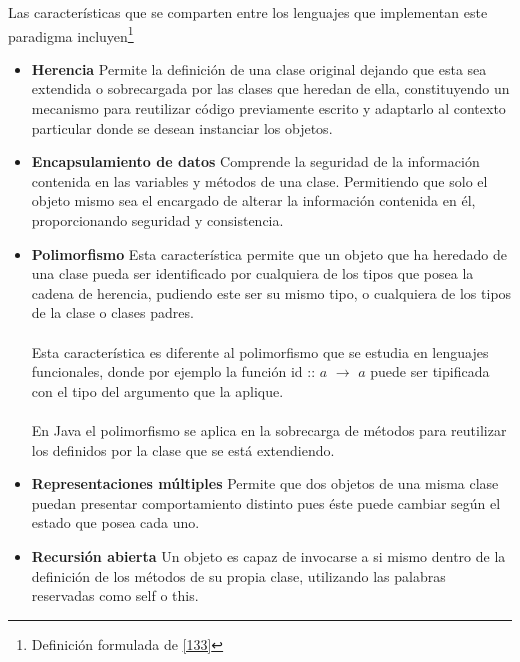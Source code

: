 Las características que se comparten entre los lenguajes que implementan este paradigma incluyen\footnote{Definición formulada de \hyperlink{133}{[133]}} 
\begin{itemize}
    \item \textbf{Herencia}
	 Permite la definición de una clase original dejando que esta sea extendida o sobrecargada por las clases que heredan de ella, constituyendo un mecanismo para reutilizar código previamente escrito y adaptarlo al contexto particular donde se desean instanciar los objetos.\\

    \item \textbf{Encapsulamiento de datos} Comprende la seguridad de la información contenida en las variables y métodos de una clase. Permitiendo que solo el objeto mismo sea el encargado de alterar la información contenida en él, proporcionando seguridad y consistencia.\\

    \item  \textbf{Polimorfismo} Esta característica permite que un objeto que ha heredado de una clase pueda ser identificado por cualquiera de los tipos que posea la cadena de herencia, pudiendo este ser su mismo tipo, o cualquiera de los tipos de la clase o clases padres.\\\\
Esta característica es diferente al polimorfismo que se estudia en lenguajes funcionales, donde por ejemplo la función \textsf{id} :: $a$ $\rightarrow$ $a$ puede ser tipificada con el tipo del argumento que la aplique.\\\\
 En Java el polimorfismo se aplica en la sobrecarga de métodos para reutilizar los definidos por la clase que se está extendiendo.\\

    \item \textbf{Representaciones múltiples} Permite que dos objetos de una misma clase puedan presentar comportamiento distinto pues éste puede cambiar según el estado que posea cada uno.\\

    \item \textbf{Recursión abierta} Un objeto es capaz de invocarse a si mismo dentro de la definición de los métodos de su propia clase, utilizando las palabras reservadas como \textsf{self} o \textsf{this}.
\end{itemize}



